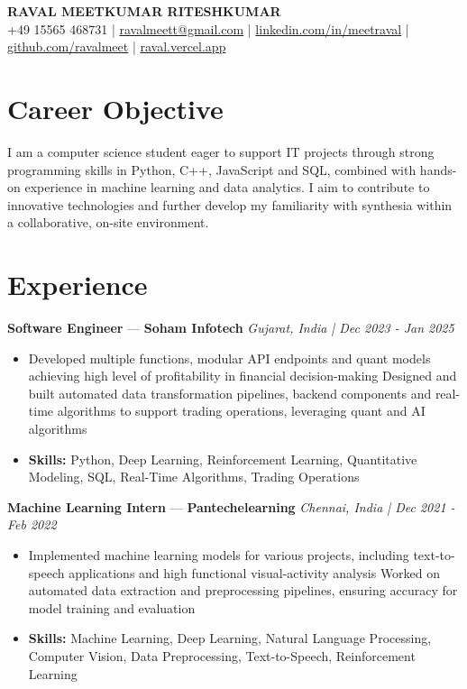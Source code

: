 \documentclass[a4paper,10pt]{article}
\begin{document}
\begin{center}
  {\Large\bfseries RAVAL MEETKUMAR RITESHKUMAR}\\[2pt]
  {\small +49 15565 468731 \;|\; \href{mailto:ravalmeett@gmail.com}{ravalmeett@gmail.com} \;|\; \href{https://www.linkedin.com/in/meetraval/}{linkedin.com/in/meetraval} \;|\; \href{https://github.com/ravalmeet}{github.com/ravalmeet} \;|\; \href{https://raval.vercel.app/}{raval.vercel.app}}
\end{center}
\vspace{-3pt}

\section*{Career Objective}
I am a computer science student eager to support IT projects through strong programming skills in Python, C++, JavaScript and SQL, combined with hands-on experience in machine learning and data analytics. I aim to contribute to innovative technologies and further develop my familiarity with synthesia within a collaborative, on-site environment.\par

\section*{Experience}
\textbf{Software Engineer} — \textbf{Soham Infotech} \hfill \textit{Gujarat, India \;|\; Dec 2023 - Jan 2025}\par
\vspace{1pt}
\begin{itemize}
  \item Developed multiple functions, modular API endpoints and quant models achieving high level of profitability in financial decision-making Designed and built automated data transformation pipelines, backend components and real-time algorithms to support trading operations, leveraging quant and AI algorithms
  \item \textbf{Skills:} Python, Deep Learning, Reinforcement Learning, Quantitative Modeling, SQL, Real-Time Algorithms, Trading Operations
\end{itemize}
\vspace{3pt}
\textbf{Machine Learning Intern} — \textbf{Pantechelearning} \hfill \textit{Chennai, India \;|\; Dec 2021 - Feb 2022}\par
\vspace{1pt}
\begin{itemize}
  \item Implemented machine learning models for various projects, including text-to-speech applications and high functional visual-activity analysis Worked on automated data extraction and preprocessing pipelines, ensuring accuracy for model training and evaluation
  \item \textbf{Skills:} Machine Learning, Deep Learning, Natural Language Processing, Computer Vision, Data Preprocessing, Text-to-Speech, Reinforcement Learning
\end{itemize}
\end{document}

